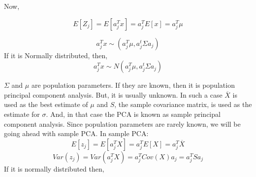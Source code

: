 \documentclass[12pt,a4paper]{report}
\begin{document}
Now,

\begin{equation}
E[Z_j] = E[a_j^T x] = a_j^T  E[x] = a_j^T  \mu
\end{equation}

\begin{equation}
a_j^T x \sim (a_j^T  \mu , a_j^t \Sigma a_j)
\end{equation}
If it is Normally distributed, then,
\begin{equation}
a_j^T x \sim N (a_j^T  \mu , a_j^t \Sigma a_j)
\end{equation}

$\Sigma$ and $\mu$ are population parameters. If they are known, then it is population principal component analysis. But, it is usually unknown. In such a case $\overline X$ is used as the best estimate of $\mu$ and $S$, the sample covariance matrix, is used as the estimate for $\sigma$. And, in that case the PCA is known as sample principal component analysis. Since population parameters are rarely known, we will be going ahead with sample PCA.
In sample PCA:
\begin{equation}
E[z_j] = E[a_j^T X] = a_j^T E[X] = a_j^T  \overline X
\end{equation}
\begin{equation}
Var(z_j) = Var(a_j^T X) = a_j^T Cov(X) a_j = a_j^T S a_j  
\end{equation}
If it is normally distributed then,
\end{document}
